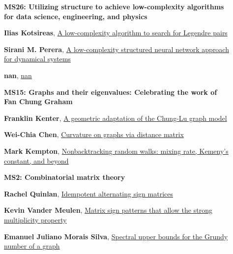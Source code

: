 \documentclass[ILAS2025-program.tex]{subfiles}
\begin{document}
\begin{description}
    \begin{description}
    \item[] {\color{mstitle}\textbf{MS26: Utilizing structure to achieve low-complexity algorithms for data science, engineering, and physics}} 
    \item[] \hypertarget{up0135}{}\textbf{Ilias Kotsireas}, \hyperlink{down0135}{A low-complexity algorithm to search for Legendre pairs
}
        \item[] \hypertarget{up0136}{}\textbf{Sirani M. Perera}, \hyperlink{down0136}{A low-complexity structured neural network approach for dynamical systems}
        \item[] \hypertarget{up0137}{}\textbf{nan}, \hyperlink{down0137}{nan}
        \end{description}
    \begin{description}
    \item[] {\color{mstitle}\textbf{MS15: Graphs and their eigenvalues: Celebrating the work of Fan Chung Graham}} 
    \item[] \hypertarget{up0138}{}\textbf{Franklin Kenter}, \hyperlink{down0138}{A geometric adaptation of the Chung-Lu graph model}
        \item[] \hypertarget{up0139}{}\textbf{Wei-Chia Chen}, \hyperlink{down0139}{Curvature on graphs via distance matrix}
        \item[] \hypertarget{up0140}{}\textbf{Mark Kempton}, \hyperlink{down0140}{Nonbacktracking random walks: mixing rate, Kemeny's constant, and beyond}
        \end{description}
    \begin{description}
    \item[] {\color{mstitle}\textbf{MS2: Combinatorial matrix theory}} 
    \item[] \hypertarget{up0141}{}\textbf{Rachel Quinlan}, \hyperlink{down0141}{Idempotent alternating sign matrices}
        \item[] \hypertarget{up0142}{}\textbf{Kevin Vander Meulen}, \hyperlink{down0142}{Matrix sign patterns that allow the strong multiplicity property}
        \item[] \hypertarget{up0143}{}\textbf{Emanuel Juliano Morais Silva}, \hyperlink{down0143}{Spectral upper bounds for the Grundy number of a graph}

\end{description}
\end{description}
\end{document}
